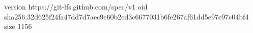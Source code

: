 version https://git-lfs.github.com/spec/v1
oid sha256:32d625f24fa47dd7d7aec9e60b2ed3c6677031b6fe267af61dd5e97e97c04bf4
size 1156
